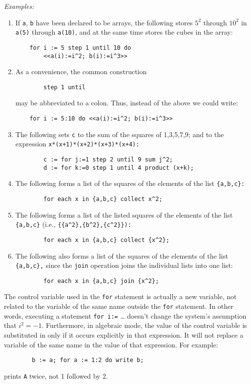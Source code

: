 \textit{Examples:}
\begin{enumerate}
\item If \texttt{a}, \texttt{b} have been declared to be arrays, the following
stores $5^{2}$ through $10^{2}$ in \texttt{a(5)} through \texttt{a(10)}, and at
the same time stores the cubes in the  array:
\begin{verbatim}
    for i := 5 step 1 until 10 do
        <<a(i):=i^2; b(i):=i^3>>
\end{verbatim}
\item As a convenience, the common construction
\begin{verbatim}
        step 1 until
\end{verbatim}
may be abbreviated to a colon. Thus, instead of the above we could write:
\begin{verbatim}
    for i := 5:10 do <<a(i):=i^2; b(i):=i^3>>
\end{verbatim}
\item The following sets \texttt{c} to the sum of the squares of 1,3,5,7,9;
and  to the expression \texttt{x*(x+1)*(x+2)*(x+3)*(x+4):}
\begin{verbatim}
        c := for j:=1 step 2 until 9 sum j^2;
        d := for k:=0 step 1 until 4 product (x+k);
\end{verbatim}
\item The following forms a list of the squares of the elements of the list
\texttt{\{a,b,c\}:}
\begin{verbatim}
        for each x in {a,b,c} collect x^2;
\end{verbatim}
\item The following forms a list of the listed squares of the elements of the
list \texttt{\{a,b,c\}}
(i.e., \texttt{\{\{a\textasciicircum 2\},\{b\textasciicircum 2\},\{c\textasciicircum 2\}\}):}
\begin{verbatim}
        for each x in {a,b,c} collect {x^2};
\end{verbatim}
\item The following also forms a list of the squares of the elements of
the list \texttt{\{a,b,c\},} since the \texttt{join} operation joins the
individual lists into one list:
\begin{verbatim}
        for each x in {a,b,c} join {x^2};
\end{verbatim}
\end{enumerate}
The control variable used in the \texttt{for} statement is actually a new
variable, not related to the variable of the same name outside the
\texttt{for} statement.  In other words, executing a statement
\texttt{for i:=} \ldots
doesn't change the system's assumption that $i^{2} = -1$.
Furthermore, in algebraic mode, the value of the control variable is
substituted in  only if it occurs explicitly in that
expression.  It will not replace a variable of the same name in the value
of that expression.  For example:
\begin{verbatim}
        b := a; for a := 1:2 do write b;
\end{verbatim}
prints \texttt{A} twice, not 1 followed by 2.

